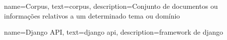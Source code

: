 {
        name=Corpus,
        text=corpus,
        description={Conjunto de documentos ou informações relativos a um determinado tema ou domínio}
}

{
	name=Django API,
	text=django api,
	description={framework de django}
}